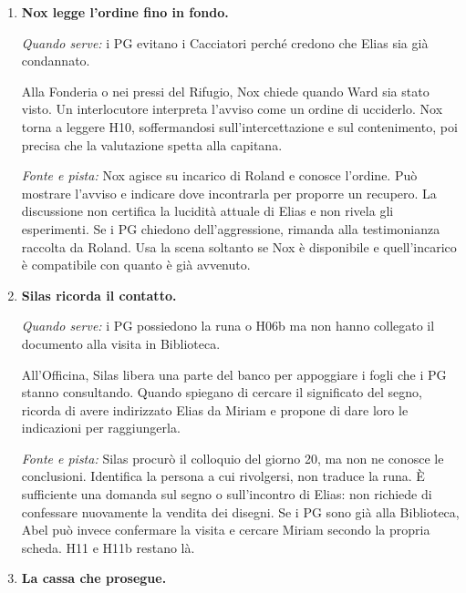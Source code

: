 \documentclass[11pt,a4paper]{article}
\begin{document}
\begin{enumerate}[leftmargin=*]
\textit{Fonte e pista:} è uno dei due nomi già cancellati fra i sei trasferiti, non una nuova vittima. Se i PG le chiedono di aiutarli a cercare i malati, Maud trova un momento per parlare e mostrare la lista conservata. Può indicare Oren e la porta dell'ala inferiore; non consegna H09 a meno che lui glielo abbia effettivamente affidato. I PG possono attendere, offrirle discrezione o rendere pubblica la contestazione, assumendosi le conseguenze della scelta.

\item \textbf{Nox legge l'ordine fino in fondo.}

\textit{Quando serve:} i PG evitano i Cacciatori perché credono che Elias sia già condannato.

Alla Fonderia o nei pressi del Rifugio, Nox chiede quando Ward sia stato visto. Un interlocutore interpreta l'avviso come un ordine di ucciderlo. Nox torna a leggere H10, soffermandosi sull'intercettazione e sul contenimento, poi precisa che la valutazione spetta alla capitana.

\textit{Fonte e pista:} Nox agisce su incarico di Roland e conosce l'ordine. Può mostrare l'avviso e indicare dove incontrarla per proporre un recupero. La discussione non certifica la lucidità attuale di Elias e non rivela gli esperimenti. Se i PG chiedono dell'aggressione, rimanda alla testimonianza raccolta da Roland. Usa la scena soltanto se Nox è disponibile e quell'incarico è compatibile con quanto è già avvenuto.

\item \textbf{Silas ricorda il contatto.}

\textit{Quando serve:} i PG possiedono la runa o H06b ma non hanno collegato il documento alla visita in Biblioteca.

All'Officina, Silas libera una parte del banco per appoggiare i fogli che i PG stanno consultando. Quando spiegano di cercare il significato del segno, ricorda di avere indirizzato Elias da Miriam e propone di dare loro le indicazioni per raggiungerla.

\textit{Fonte e pista:} Silas procurò il colloquio del giorno 20, ma non ne conosce le conclusioni. Identifica la persona a cui rivolgersi, non traduce la runa. È sufficiente una domanda sul segno o sull'incontro di Elias: non richiede di confessare nuovamente la vendita dei disegni. Se i PG sono già alla Biblioteca, Abel può invece confermare la visita e cercare Miriam secondo la propria scheda. H11 e H11b restano là.

\item \textbf{La cassa che prosegue.}


\end{enumerate}
\end{document}
